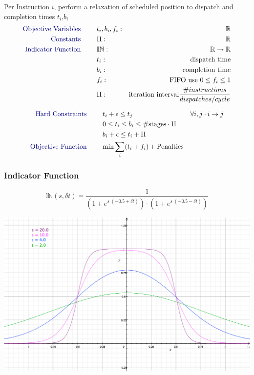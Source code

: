 \documentclass[a0,landscape,24pt]{a0poster}
\begin{document}
\begin{multicols}{3}
    Per Instruction $i$, perform a relaxation of scheduled position to dispatch and completion times $t_i$,$b_i$
    \begin{align*}
    \text{\color{Navy} Objective Variables \qquad} & t_i, b_i, f_i:& \mathbb{R} \\
    \text{\color{Navy} Constants \qquad} & \textrm{II} :& \mathbb{R} \\
    \text{\color{Navy} Indicator Function \qquad} & \mathbb{IN} :& \mathbb{R} \rightarrow \mathbb{R} \\
    & t_i :& \text{dispatch time} \\
    & b_i :& \text{completion time} \\
    & f_i :& \text{FIFO use } 0 \leq f_i \leq 1 \\
    & \textrm{II} :& \text{iteration interval} \frac{\# instructions}{dispatches/cycle} \\
    \end{align*}
    
    \begin{align}
    \text{\color{Navy} Hard Constraints \qquad}  & t_i + \epsilon \leq t_j \qquad & \forall i,j \cdot i \rightarrow j \\
								 & 0 \leq t_i \leq b_i \leq \#\text{stages} \cdot \textrm{II}  & \\
								 & b_i + \epsilon \leq t_i + \textrm{II} \\
    \text{\color{Navy} Objective Function \qquad}   & \text{min} \sum_{i} (t_i + f_i) + \text{Penalties}
    \end{align}




\subsubsection*{Indicator Function}

\begin{equation}
\mathbb{IN}(s,\delta t) = \frac{1}{(1 + e^{s \; (-0.5 + \delta t)}) \cdot (1 + e^{s \; (-0.5 - \delta t)})}
\end{equation}

\begin{center}\vspace{1cm}
\includegraphics[width=0.7\linewidth]{sigmoid}
\end{center}\vspace{1cm}


\end{multicols}
\end{document}
